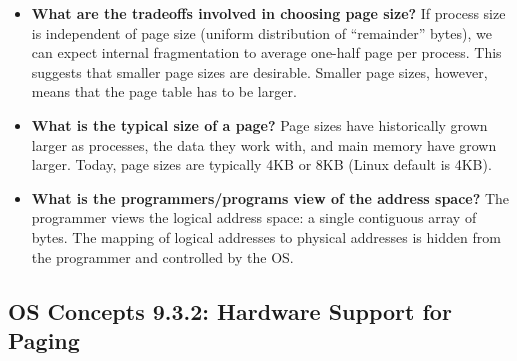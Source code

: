 \documentclass[12pt]{article}
\begin{document}
\begin{itemize}
    \item \textbf{What are the tradeoffs involved in choosing page size?} If process size is independent of page size (uniform distribution of ``remainder'' bytes), we can expect internal fragmentation to average one-half page per process. This suggests that smaller page sizes are desirable. Smaller page sizes, however, means that the page table has to be larger.
    \item \textbf{What is the typical size of a page?} Page sizes have historically grown larger as processes, the data they work with, and main memory have grown larger. Today, page sizes are typically 4KB or 8KB (Linux default is 4KB).
    \item \textbf{What is the programmers/programs view of the address space?} The programmer views the logical address space: a single contiguous array of bytes. The mapping of logical addresses to physical addresses is hidden from the programmer and controlled by the OS.
\end{itemize}

\subsection*{OS Concepts 9.3.2: Hardware Support for Paging}
\end{document}
